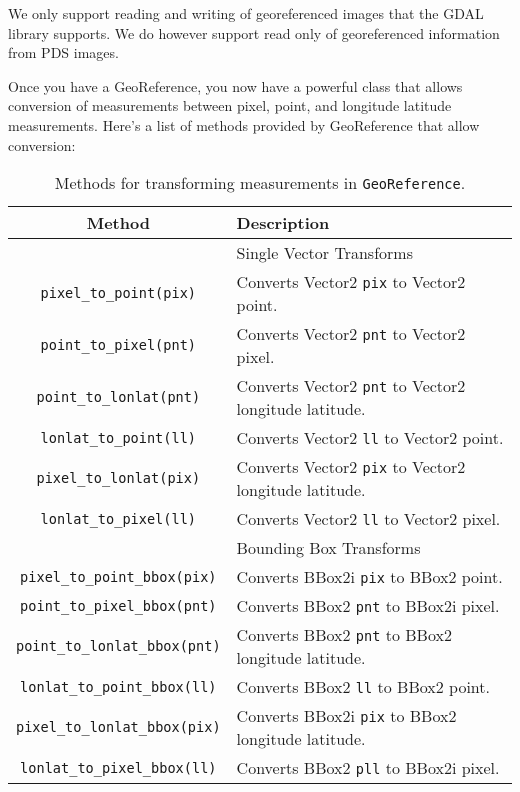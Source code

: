 We only support reading and writing of georeferenced images that the
GDAL library supports. We do however support read only of
georeferenced information from PDS images.

Once you have a GeoReference, you now have a powerful class that
allows conversion of measurements between pixel, point, and longitude
latitude measurements. Here’s a list of methods provided by
GeoReference that allow conversion:

\begin{table}[htb]\begin{centering}
\begin{tabular}{|c|p{5 in}|} \hline
Method & Description \\ \hline \hline
 & Single Vector Transforms \\ \hline
\verb#pixel_to_point(pix)# & Converts Vector2 \verb#pix# to Vector2 point. \\ \hline
\verb#point_to_pixel(pnt)# & Converts Vector2 \verb#pnt# to Vector2 pixel.\\ \hline
\verb#point_to_lonlat(pnt)# & Converts Vector2 \verb#pnt# to Vector2 longitude latitude.\\ \hline
\verb#lonlat_to_point(ll)# & Converts Vector2 \verb#ll# to Vector2 point.\\ \hline
\verb#pixel_to_lonlat(pix)# & Converts Vector2 \verb#pix# to Vector2 longitude latitude.\\ \hline
\verb#lonlat_to_pixel(ll)# & Converts Vector2 \verb#ll# to Vector2 pixel.\\ \hline
 & Bounding Box Transforms \\ \hline
\verb#pixel_to_point_bbox(pix)# & Converts BBox2i \verb#pix# to BBox2 point.\\ \hline
\verb#point_to_pixel_bbox(pnt)# & Converts BBox2 \verb#pnt# to BBox2i pixel.\\ \hline
\verb#point_to_lonlat_bbox(pnt)# & Converts BBox2 \verb#pnt# to BBox2 longitude latitude.\\ \hline
\verb#lonlat_to_point_bbox(ll)# & Converts BBox2 \verb#ll# to BBox2 point.\\ \hline
\verb#pixel_to_lonlat_bbox(pix)# & Converts BBox2i \verb#pix# to BBox2 longitude latitude.\\ \hline
\verb#lonlat_to_pixel_bbox(ll)# & Converts BBox2 \verb#pll# to BBox2i pixel.\\ \hline
\end{tabular}
\caption{Methods for transforming measurements in {\tt GeoReference}.}
\end{centering}
\end{table}

